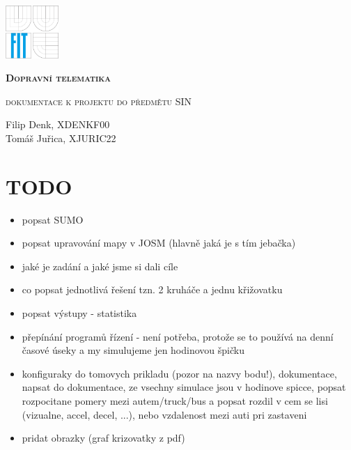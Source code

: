 \documentclass[a4paper,11pt]{article}
\begin{document}
\begin{titlepage}
	\centering
	\includegraphics[width=0.15\textwidth]{fig/fit-zp2.pdf}\par\vspace{7cm}
	{\scshape\LARGE\bfseries Dopravní telematika\par}
	\vspace{0.5cm}
	{\scshape\Large dokumentace k projektu do předmětu SIN \par}
	\vspace{1.5cm}
	{\huge\bfseries \par}
	\vspace{2cm}
	{\Large\itshape \par}
	\vspace{8cm}
	Filip Denk, XDENKF00
	\\Tomáš Juřica, XJURIC22
\end{titlepage}


\section{TODO}
\begin{itemize}
	\item popsat SUMO
	\item popsat upravování mapy v JOSM (hlavně jaká je s tím jebačka)
	\item jaké je zadání a jaké jsme si dali cíle
	\item co popsat jednotlivá řešení tzn. 2 kruháče a jednu křižovatku
	\item popsat výstupy - statistika
	\item přepínání programů řízení - není potřeba, protože se to používá na denní časové úseky a my simulujeme jen hodinovou špičku
	\item konfiguraky do tomovych prikladu (pozor na nazvy bodu!), dokumentace, napsat do dokumentace, ze vsechny simulace jsou v hodinove spicce, popsat rozpocitane pomery mezi autem/truck/bus a popsat rozdil v cem se lisi (vizualne, accel, decel, ...), nebo vzdalenost mezi auti pri zastaveni
	\item pridat obrazky (graf krizovatky z pdf)
\end{itemize}
\end{document}
